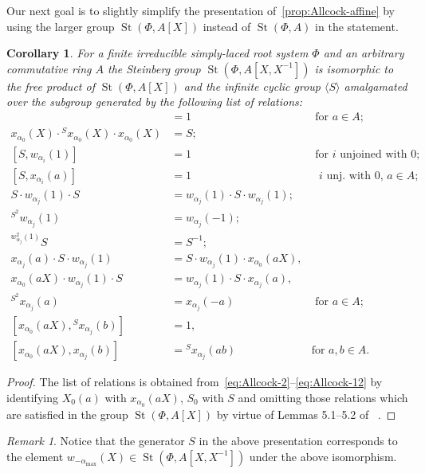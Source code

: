 \documentclass[oneside, 10pt]{amsart}
\DeclareMathOperator{\St}{St}
\newcommand{\inv}{^{-1}}
\numberwithin{equation}{section}
\numberwithin{thm}{section}
\numberwithin{lemma}{section}
\newtheorem{cor}[thm]{Corollary}
\theoremstyle{definition}
\theoremstyle{remark}
\newtheorem{rem}[lemma]{Remark}
\begin{document}
Our next goal is to slightly simplify the presentation of~\cref{prop:Allcock-affine} by using the larger group $\St(\Phi, A[X])$ instead of $\St(\Phi, A)$ in the statement.
\begin{cor} \label{cor:Allcock-simpler}
For a finite irreducible simply-laced root system $\Phi$ and an arbitrary commutative ring $A$ the Steinberg group $\St(\Phi, A[X, X\inv])$ is isomorphic
to the free product of $\St(\Phi, A[X])$ and the infinite cyclic group $\langle S \rangle$ amalgamated over the subgroup generated by the following list of relations:
{\allowdisplaybreaks\begin{align}
[S^2, x_{\alpha_0}(aX)] & = 1 & \text{ for $a \in A$; } \label{eq:simpler-2} \\
x_{\alpha_0}(X) \cdot {}^{S} x_{\alpha_0}(X) \cdot x_{\alpha_0}(X) & = S; \label{eq:simpler-3} \\
[S, w_{\alpha_i}(1)] & = 1 & \text{ for $i$ unjoined with $0$;} \label{eq:simpler-4} \\
[S, x_{\alpha_i}(a)] & = 1 & \text{ $i$ unj. with $0$, $a \in A$; } \label{eq:simpler-5-1}\\
S \cdot w_{\alpha_j}(1) \cdot S & = w_{\alpha_j}(1) \cdot S \cdot w_{\alpha_j}(1); \label{eq:simpler-7} \\
{}^{S^2} w_{\alpha_j}(1) & = w_{\alpha_j}(-1); \label{eq:simpler-8-1} \\
{}^{w_{\alpha_j}^2(1)} S & = S^{-1}; \label{eq:simpler-8-2} \\
x_{\alpha_j}(a) \cdot S \cdot w_{\alpha_j}(1) & = S \cdot w_{\alpha_j}(1) \cdot x_{\alpha_0}(aX), & \label{eq:simpler-9-1} \\
x_{\alpha_0}(aX) \cdot w_{\alpha_j}(1) \cdot S & = w_{\alpha_j}(1) \cdot S \cdot x_{\alpha_j}(a), & \label{eq:simpler-9-2} \\
{}^{S^2} x_{\alpha_j}(a) & = x_{\alpha_j}(-a) & \text{ for $a \in A$; } \label{eq:simpler-10-1} \\
[x_{\alpha_0}(aX), {}^{S} x_{\alpha_j}(b)] &= 1, & \label{eq:simpler-11-1} \\
[x_{\alpha_0}(aX), x_{\alpha_j}(b)] &= {}^{S} x_{\alpha_j}(ab) & \text{for $a, b \in A.$} \label{eq:simpler-12}
\end{align}}
\end{cor}
\begin{proof}
The list of relations is obtained from~\eqref{eq:Allcock-2}--\eqref{eq:Allcock-12} by identifying $X_0(a)$ with $x_{\alpha_0}(aX)$, $S_0$ with $S$ and omitting those relations
which are satisfied in the group $\St(\Phi, A[X])$ by virtue of Lemmas 5.1--5.2 of ~\cite{Ma69}.
\end{proof}
\begin{rem}
Notice that the generator $S$ in the above presentation corresponds to the element $w_{-\alpha_\mathrm{max}}(X) \in \St(\Phi, A[X, X\inv])$ under the above isomorphism.
\end{rem}
\end{document}
